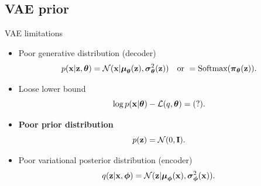 \subsection{VAE prior}
\begin{frame}{VAE limitations}
	\begin{itemize}
		\item Poor generative distribution (decoder)
		\[
		p(\mathbf{x} | \mathbf{z}, \boldsymbol{\theta}) = \mathcal{N}(\mathbf{x}| \boldsymbol{\mu}_{\boldsymbol{\theta}}(\mathbf{z}), \boldsymbol{\sigma}^2_{\boldsymbol{\theta}}(\mathbf{z})) \quad \text{or } = \text{Softmax}(\boldsymbol{\pi}_{\boldsymbol{\theta}}(\mathbf{z})).
		\]
		\item Loose lower bound
		\[
		\log p(\mathbf{x} | \boldsymbol{\theta}) - \mathcal{L}(q, \boldsymbol{\theta}) = (?).
		\]
		\item \textbf{Poor prior distribution}
		\[
		p(\mathbf{z}) = \mathcal{N}(0, \mathbf{I}).
		\]
		\item Poor variational posterior distribution (encoder)
		\[
		q(\mathbf{z} | \mathbf{x}, \boldsymbol{\phi}) = \mathcal{N}(\mathbf{z}| \boldsymbol{\mu}_{\boldsymbol{\phi}}(\mathbf{x}), \boldsymbol{\sigma}^2_{\boldsymbol{\phi}}(\mathbf{x})).
		\]
	\end{itemize}
\end{frame}
